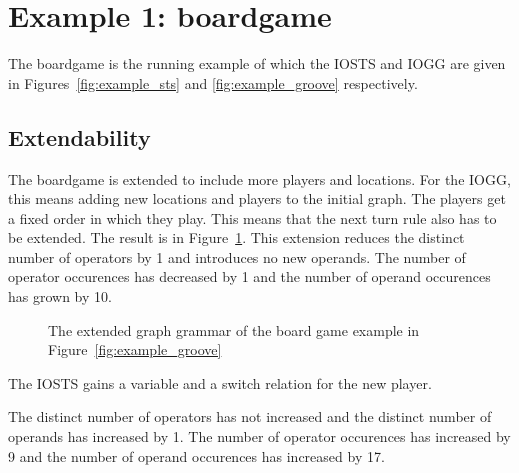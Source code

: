 \section{Example 1: boardgame}
The boardgame is the running example of which the IOSTS and IOGG are given in Figures~\ref{fig:example_sts} and \ref{fig:example_groove} respectively.

\subsection{Extendability}
The boardgame is extended to include more players and locations. For the IOGG, this means adding new locations and players to the initial graph. The players get a fixed order in which they play. This means that the next turn rule also has to be extended. The result is in Figure~\ref{fig:gg-bg-extended}. This extension reduces the distinct number of operators by 1 and introduces no new operands. The number of operator occurences has decreased by 1 and the number of operand occurences has grown by 10.

\begin{figure}[ht]
  \begin{center}
    \hspace{20px}
  \end{center}
  \caption{The extended graph grammar of the board game example in Figure~\ref{fig:example_groove}}
  \label{fig:gg-bg-extended}
\end{figure}

The IOSTS gains a variable and a switch relation for the new player. \begin{comment}The result is in Figure~\ref{fig:sts-bg-extended}.\end{comment} The distinct number of operators has not increased and the distinct number of operands has increased by 1. The number of operator occurences has increased by 9 and the number of operand occurences has increased by 17.


